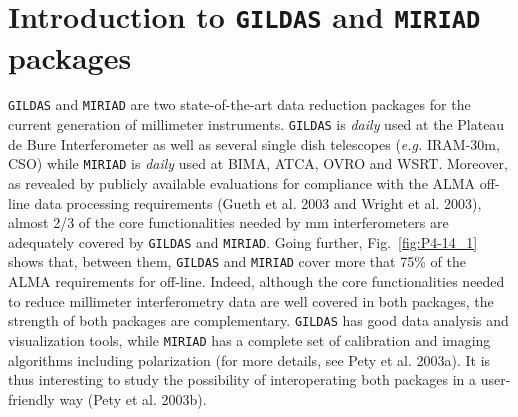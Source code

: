 \documentclass[11pt,twoside]{article}  %
\newcommand{\GILDAS}{\texttt{GILDAS}}
\newcommand{\MIRIAD}{\texttt{MIRIAD}}
\newcommand{\ALMA}{\textrm{ALMA}}
\newcommand{\IRAMthm}{\textrm{IRAM-30m}}
\newcommand{\CSO}{\textrm{CSO}}
\newcommand{\eg} {{\em e.g.}}
\begin{document}
%
%

\section{Introduction to \GILDAS{} and \MIRIAD{} packages}

\GILDAS{} and \MIRIAD{} are two state-of-the-art data reduction packages
for the current generation of millimeter instruments. \GILDAS{} is
\emph{daily} used at the Plateau de Bure Interferometer as well as several
single dish telescopes (\eg{} \IRAMthm{}, \CSO{}) while \MIRIAD{} is
\emph{daily} used at BIMA, ATCA, OVRO and WSRT. Moreover, as revealed by
publicly available evaluations for compliance with the \ALMA{} off-line
data processing requirements (Gueth et al. 2003 and Wright et al. 2003),
almost 2/3 of the core functionalities needed by mm interferometers are
adequately covered by \GILDAS{} and \MIRIAD{}.  Going further,
Fig.~\ref{fig:P4-14_1} shows that, between them, \GILDAS{} and \MIRIAD{}
cover more that 75\% of the \ALMA{} requirements for off-line.  Indeed,
although the core functionalities needed to reduce millimeter
interferometry data are well covered in both packages, the strength of both
packages are complementary. \GILDAS{} has good data analysis and
visualization tools, while \MIRIAD{} has a complete set of calibration and
imaging algorithms including polarization (for more details, see Pety et
al. 2003a). It is thus interesting to study the possibility of
interoperating both packages in a user-friendly way (Pety et al. 2003b).
\end{document}
